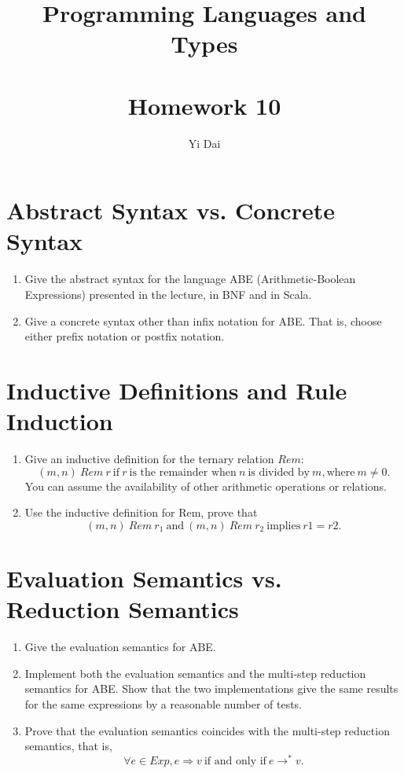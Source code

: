 \documentclass[a4paper,12pt]{article}
\title{
 Programming Languages and Types \\~\\
 \textbf{Homework 10}
}
\author{
 Yi Dai
}
\begin{document}
\maketitle

\section{Abstract Syntax vs. Concrete Syntax}

\begin{enumerate}
 \item Give the abstract syntax for the language ABE (Arithmetic-Boolean Expressions)
  presented in the lecture, in BNF and in Scala.

 \item Give a concrete syntax other than infix notation for ABE. That is, choose either
  prefix notation or postfix notation.
\end{enumerate}

\section{Inductive Definitions and Rule Induction}

\begin{enumerate}
 \item Give an inductive definition for the ternary relation $Rem$:
  \[
    (m, n)\ Rem\ r\ \text{if}\ r\ \text{is the remainder when}\ n\ \text{is divided by}\
    m, \text{where}\ m \ne 0.
  \]
  You can assume the availability of other arithmetic operations or relations.

 \item Use the inductive definition for Rem, prove that
  \[
    (m, n)\ Rem\ r_1\ \text{and}\ (m, n)\ Rem\ r_2\ \text{implies}\ r1 = r2.
  \]
\end{enumerate}

\section{Evaluation Semantics vs. Reduction Semantics}

\begin{enumerate}
 \item Give the evaluation semantics for ABE.

 \item Implement both the evaluation semantics and the multi-step reduction semantics for
  ABE. Show that the two implementations give the same results for the same expressions by
  a reasonable number of tests.

 \item Prove that the evaluation semantics coincides with the multi-step reduction 
  semantics, that is,
  \[ \forall e \in Exp, e \Longrightarrow v\ \text{if and only if}\ e \longrightarrow^{*}
      v.
  \]
\end{enumerate}
\end{document}
